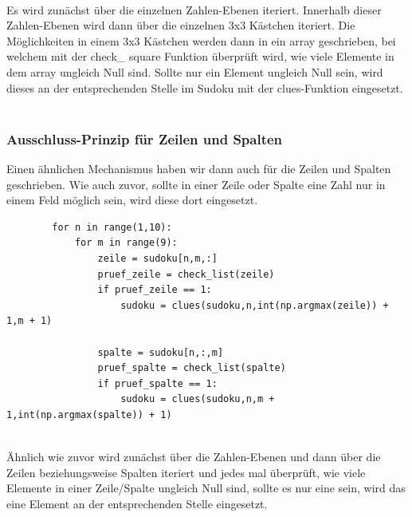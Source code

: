 \documentclass[11pt,a4paper]{article}
\begin{document}
\ \\
Es wird zunächst über die einzelnen Zahlen-Ebenen iteriert. Innerhalb dieser Zahlen-Ebenen wird dann über die einzelnen 3x3 Kästchen iteriert. Die Möglichkeiten in einem 3x3 Kästchen werden dann in ein array geschrieben, bei welchem mit der check\_ square Funktion überprüft wird, wie viele Elemente in dem array ungleich Null sind.
Sollte nur ein Element ungleich Null sein, wird dieses an der entsprechenden Stelle im Sudoku mit der clues-Funktion eingesetzt.\\
\ \\
\subsubsection{Ausschluss-Prinzip für Zeilen und Spalten}
Einen ähnlichen Mechanismus haben wir dann auch für die Zeilen und Spalten geschrieben. Wie auch zuvor, sollte in einer Zeile oder Spalte eine Zahl nur in einem Feld möglich sein, wird diese dort eingesetzt.
\ \\
\begin{verbatim}
        for n in range(1,10):  
            for m in range(9): 
                zeile = sudoku[n,m,:]  
                pruef_zeile = check_list(zeile) 
                if pruef_zeile == 1:      
                    sudoku = clues(sudoku,n,int(np.argmax(zeile)) + 1,m + 1)  
                    
                spalte = sudoku[n,:,m] 
                pruef_spalte = check_list(spalte)
                if pruef_spalte == 1:     
                    sudoku = clues(sudoku,n,m + 1,int(np.argmax(spalte)) + 1)               
\end{verbatim}
\ \\
Ähnlich wie zuvor wird zunächst über die Zahlen-Ebenen und dann über die Zeilen beziehungsweise Spalten iteriert und jedes mal überprüft, wie viele Elemente in einer Zeile/Spalte ungleich Null sind, sollte es nur eine sein, wird das eine Element an der entsprechenden Stelle eingesetzt.\\
\ \\
\end{document}
